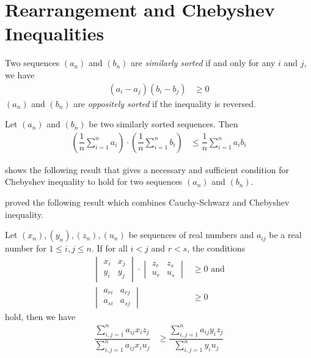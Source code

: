 \documentclass{subfile}
\begin{document}
	\section[Rearrangement and Chebyshev]{Rearrangement and Chebyshev Inequalities}\label{sec:rearragement}
	Two sequences $(a_n)$ and $(b_n)$ are \textit{similarly sorted} if and only for any $i$ and $j$, we have
		\begin{align*}
			(a_i-a_j)(b_i-b_j)
				& \geq0
		\end{align*}
	$(a_n)$ and $(b_n)$ are \textit{oppositely sorted} if the inequality is reversed.

		\begin{theorem}
			Let $(a_n)$ and $(b_n)$ be two similarly sorted sequences. Then
				\begin{align*}
					\left(\dfrac{1}{n}\sum\limits_{i=1}^na_i\right)\cdot\left(\dfrac{1}{n}\sum\limits_{i=1}^nb_i\right)
						& \leq\dfrac{1}{n}\sum\limits_{i=1}^na_ib_i
				\end{align*}
		\end{theorem}
	\textcite{sasser_slater_1967} shows the following result that gives a necessary and sufficient condition for Chebyshev inequality to hold for two sequences $(a_n)$ and $(b_n)$.
		\begin{theorem}

		\end{theorem}
	\textcite{seitz_1936} proved the following result which combines Cauchy-Schwarz and Chebyshev inequality.
		\begin{theorem}
			Let $(x_n),(y_n),(z_n),(u_n)$ be sequences of real numbers and $a_{ij}$ be a real number for $1\leq i,j\leq n$. If for all $i<j$ and $r<s$, the conditions
				\begin{align*}
					\begin{vmatrix}
						x_i & x_j\\
						y_i & y_j
					\end{vmatrix}\cdot
					\begin{vmatrix}
						z_r & z_s\\
						u_r & u_s
					\end{vmatrix}
						& \geq0\mbox{ and}\\
					\begin{vmatrix}
						a_{ri} & a_{rj}\\
						a_{si} & a_{sj}
					\end{vmatrix}
						& \geq0
				\end{align*}
			hold, then we have
				\begin{align*}
					\dfrac{\sum\limits_{i,j=1}^na_{ij}x_iz_j}{\sum\limits_{i,j=1}^na_{ij}x_iu_j}
						& \geq\dfrac{\sum\limits_{i,j=1}^na_{ij}y_iz_j}{\sum\limits_{i,j=1}^ny_iu_j}
				\end{align*}
		\end{theorem}
\end{document}
